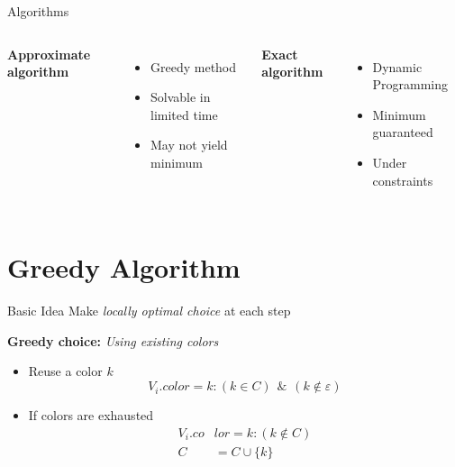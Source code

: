 \documentclass[12pt]{beamer}
\begin{document}
	\begin{frame}{Algorithms}
		\begin{columns}
			\centering
			\large
			\textbf{Approximate algorithm}
			\normalsize \vspace{10pt}
			\begin{itemize}
				\item Greedy method
				\item Solvable in limited time
				\item May not yield minimum
			\end{itemize}
			
			\pause
			
			\centering
			\large
			\textbf{Exact algorithm}
			\normalsize \vspace{10pt}
			\begin{itemize}
				\item Dynamic Programming
				\item Minimum guaranteed
				\item Under constraints
			\end{itemize}
		\end{columns}
	\end{frame}
	
	\section{Greedy Algorithm}
	
	\begin{frame}{Basic Idea}	
		Make \emph{locally optimal choice} at each step \vspace{20pt}
		
		\textbf{Greedy choice:} \textit{Using existing colors} \vspace{20pt}\pause
		
		\begin{itemize}
			\item Reuse a color $k$
			\begin{equation}
			\label{eqn:1}
			V_i.color = k : (k \in C) \hspace{5pt} \& \hspace{5pt} (k \not\in \varepsilon)
			\end{equation}
			\pause
			
			\item If colors are exhausted
			\begin{equation}
			\begin{aligned}
			\label{eqn:2}
			V_i.co&lor = k : (k \not\in C) \\
			C & = C \cup \{k\}
			\end{aligned}
			\end{equation}
		\end{itemize}
	\end{frame}
	
\end{document}
